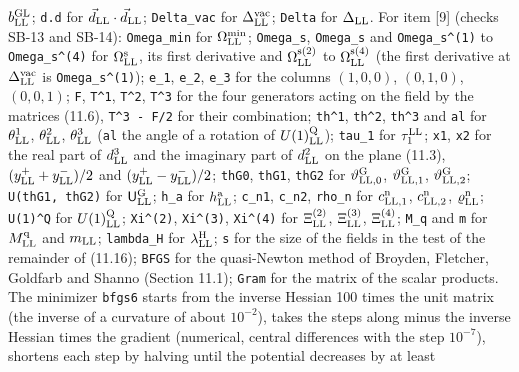 \documentclass[
  10pt,
]{article}
\begin{document}
\(b^{\rm GL}_{\rm LL}\); \texttt{d.d} for
\(\vec d_{\rm LL}\cdot\vec d_{\rm LL}\); \texttt{Delta\_vac} for
\(\Delta^{\rm vac}_{\rm LL}\); \texttt{Delta} for \(\Delta_{\rm LL}\).
For item {[}9{]} (checks SB-13 and SB-14): \texttt{Omega\_min} for
\(\Omega^{\rm min}_{\rm LL}\); \texttt{Omega\_s},
\texttt{Omega\_s\textquotesingle{}} and \texttt{Omega\_s\^{}(1)} to
\texttt{Omega\_s\^{}(4)} for \(\Omega^{\rm s}_{\rm LL}\), its first
derivative and \(\Omega^{\rm s(2)}_{\rm LL}\) to
\(\Omega^{\rm s(4)}_{\rm LL}\) (the first derivative at
\(\Delta^{\rm vac}_{\rm LL}\) is \texttt{Omega\_s\^{}(1)});
\texttt{e\_1}, \texttt{e\_2}, \texttt{e\_3} for the columns \((1,0,0)\),
\((0,1,0)\), \((0,0,1)\); \texttt{F}, \texttt{T\^{}1}, \texttt{T\^{}2},
\texttt{T\^{}3} for the four generators acting on the field by the
matrices (11.6), \texttt{T\^{}3\ -\ F/2} for their combination;
\texttt{th\^{}1}, \texttt{th\^{}2}, \texttt{th\^{}3} and \texttt{al} for
\(\theta^1_{\rm LL}\), \(\theta^2_{\rm LL}\), \(\theta^3_{\rm LL}\)
(\texttt{al} the angle of a rotation of \(U(1)^{\rm Q}_{\rm LL}\));
\texttt{tau\_1} for \(\tau^{\rm LL}_1\); \texttt{x1}, \texttt{x2} for
the real part of \(d^3_{\rm LL}\) and the imaginary part of
\(d^2_{\rm LL}\) on the plane (11.3), \((y^+_{\rm LL}+y^-_{\rm LL})/2\)
and \((y^+_{\rm LL}-y^-_{\rm LL})/2\); \texttt{thG0}, \texttt{thG1},
\texttt{thG2} for \(\vartheta^{\rm G}_{{\rm LL},0}\),
\(\vartheta^{\rm G}_{{\rm LL},1}\), \(\vartheta^{\rm G}_{{\rm LL},2}\);
\texttt{U(thG1,\ thG2)} for \(\mathsf U^{\rm G}_{\rm LL}\);
\texttt{h\_a} for \(h^{\rm a}_{\rm LL}\); \texttt{c\_n1},
\texttt{c\_n2}, \texttt{rho\_n} for \(c^{\rm n}_{{\rm LL},1}\),
\(c^{\rm n}_{{\rm LL},2}\), \(\varrho^{\rm n}_{\rm LL}\);
\texttt{U(1)\^{}Q} for \(U(1)^{\rm Q}_{\rm LL}\); \texttt{Xi\^{}(2)},
\texttt{Xi\^{}(3)}, \texttt{Xi\^{}(4)} for \(\Xi^{(2)}_{\rm LL}\),
\(\Xi^{(3)}_{\rm LL}\), \(\Xi^{(4)}_{\rm LL}\); \texttt{M\_q} and
\texttt{m} for \(M^{\rm q}_{\rm LL}\) and \(m_{\rm LL}\);
\texttt{lambda\_H} for \(\lambda^{\rm H}_{\rm LL}\); \texttt{s} for the
size of the fields in the test of the remainder of (11.16);
\texttt{BFGS} for the quasi-Newton method of Broyden, Fletcher, Goldfarb
and Shanno (Section 11.1); \texttt{Gram} for the matrix of the scalar
products. The minimizer \texttt{bfgs6} starts from the inverse Hessian
100 times the unit matrix (the inverse of a curvature of about
\(10^{-2}\)), takes the steps along minus the inverse Hessian times the
gradient (numerical, central differences with the step \(10^{-7}\)),
shortens each step by halving until the potential decreases by at least
\end{document}
